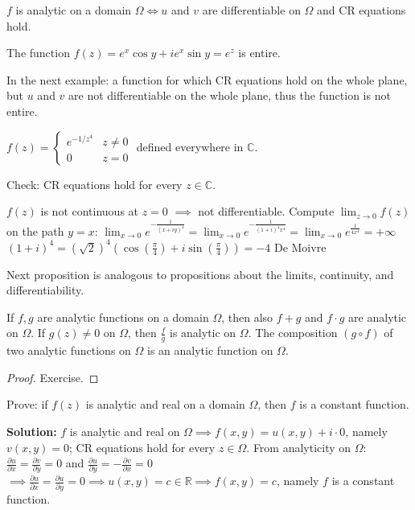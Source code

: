 \documentclass[12pt]{article}
\begin{document}
\begin{remark}
$f$ is analytic on a domain $\Omega \iff u$ and $v$ are differentiable on $\Omega$ and CR equations hold.
\end{remark}

\begin{example}
The function $f(z) = e^x\cos y + ie^x\sin y = e^z$ is entire.
\end{example}

In the next example: a function for which CR equations hold on the whole plane, but $u$ and $v$ are not differentiable on the whole plane, thus the function is not entire.

\begin{example}
$f(z) = \begin{cases} e^{-1/z^4} & z \neq 0 \\ 0 & z=0 \end{cases}$ defined everywhere in $\mathbb{C}$.

Check: CR equations hold for every $z \in \mathbb{C}$.
\end{example}

\begin{remark}
$f(z)$ is not continuous at $z=0$ $\implies$ not differentiable.
Compute $\lim_{z\to 0}f(z)$ on the path $y=x$:
$\lim_{x\to 0} e^{-\frac{1}{(x+iy)^4}} = \lim_{x\to 0} e^{-\frac{1}{(1+i)^4x^4}} = \lim_{x\to 0} e^{\frac{1}{4x^4}} = +\infty$
$(1+i)^4 = (\sqrt{2})^4(\cos(\frac{\pi}{4}) + i\sin(\frac{\pi}{4})) = -4$
De Moivre
\end{remark}

Next proposition is analogous to propositions about the limits, continuity, and differentiability.

\begin{proposition}
If $f, g$ are analytic functions on a domain $\Omega$, then also $f+g$ and $f\cdot g$ are analytic on $\Omega$. If $g(z) \neq 0$ on $\Omega$, then $\frac{f}{g}$ is analytic on $\Omega$. The composition $(g \circ f)$ of two analytic functions on $\Omega$ is an analytic function on $\Omega$.
\end{proposition}
\begin{proof}
Exercise.
\end{proof}

\begin{example}
Prove: if $f(z)$ is analytic and real on a domain $\Omega$, then $f$ is a constant function.

\textbf{Solution:} $f$ is analytic and real on $\Omega \implies f(x,y) = u(x,y) + i\cdot 0$, namely $v(x,y) = 0$; CR equations hold for every $z \in \Omega$.
From analyticity on $\Omega$: $\frac{\partial u}{\partial x} = \frac{\partial v}{\partial y} = 0$ and $\frac{\partial u}{\partial y} = -\frac{\partial v}{\partial x} = 0$
$\implies \frac{\partial u}{\partial x} = \frac{\partial u}{\partial y} = 0 \implies u(x,y) = c \in \mathbb{R} \implies f(x,y) = c$, namely $f$ is a constant function.
\end{example}
\end{document}

